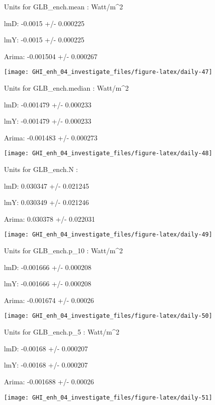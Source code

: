 \documentclass[
  10pt,
  a4paper,oneside]{article}
\begin{document}
Units for GLB\_ench.mean : Watt/m\^{}2

lmD: -0.0015 +/- 0.000225

lmY: -0.0015 +/- 0.000225

Arima: -0.001504 +/- 0.000267

\begin{center}\texttt{[image: GHI\_enh\_04\_investigate\_files/figure-latex/daily-47]} \end{center}

Units for GLB\_ench.median : Watt/m\^{}2

lmD: -0.001479 +/- 0.000233

lmY: -0.001479 +/- 0.000233

Arima: -0.001483 +/- 0.000273

\begin{center}\texttt{[image: GHI\_enh\_04\_investigate\_files/figure-latex/daily-48]} \end{center}

Units for GLB\_ench.N :

lmD: 0.030347 +/- 0.021245

lmY: 0.030349 +/- 0.021246

Arima: 0.030378 +/- 0.022031

\begin{center}\texttt{[image: GHI\_enh\_04\_investigate\_files/figure-latex/daily-49]} \end{center}

Units for GLB\_ench.p\_10 : Watt/m\^{}2

lmD: -0.001666 +/- 0.000208

lmY: -0.001666 +/- 0.000208

Arima: -0.001674 +/- 0.00026

\begin{center}\texttt{[image: GHI\_enh\_04\_investigate\_files/figure-latex/daily-50]} \end{center}

Units for GLB\_ench.p\_5 : Watt/m\^{}2

lmD: -0.00168 +/- 0.000207

lmY: -0.00168 +/- 0.000207

Arima: -0.001688 +/- 0.00026

\begin{center}\texttt{[image: GHI\_enh\_04\_investigate\_files/figure-latex/daily-51]} \end{center}
\end{document}
